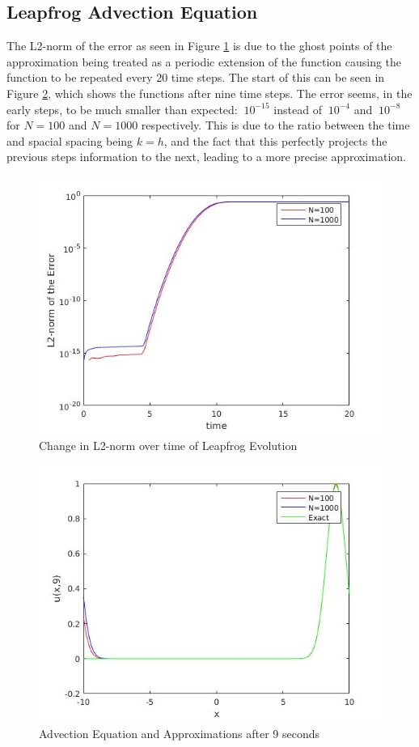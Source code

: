 \subsection{Leapfrog Advection Equation}
The L2-norm of the error as seen in Figure \ref{leapfrog_adv_l2} is due to the ghost points of the approximation being treated as a periodic extension of the function causing the function to be repeated every 20 time steps. The start of this can be seen in Figure \ref{leapfrog_adv}, which shows the functions after nine time steps. The error seems, in the early steps, to be much smaller than expected: $~10^{-15}$ instead of $~10^{-4}$ and $~10^{-8}$ for $N=100$ and $N=1000$ respectively. This is due to the ratio between the time and spacial spacing being $k=h$, and the fact that this perfectly projects the previous steps information to the next, leading to a more precise approximation.
\begin{figure}[H]
 \centering
 \includegraphics[scale=0.5]{Images/leapfrog_adv_l2.jpg}
 \caption{Change in L2-norm over time of Leapfrog Evolution}
 \label{leapfrog_adv_l2}
\end{figure}
\begin{figure}[H]
 \centering
 \includegraphics[scale=0.5]{Images/leapfrog_adv.jpg}
 \caption{Advection Equation and Approximations after 9 seconds}
 \label{leapfrog_adv}
\end{figure}
